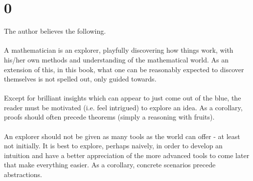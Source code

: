 \documentclass[english]{article}
\begin{document}
\section*{0}
The author believes the following.
\\\\
A mathematician is an explorer, playfully discovering how things work, with his/her own methods and understanding of the mathematical world. As an extension of this, in this book, what one can be reasonably expected to discover themselves is not spelled out, only guided towards. \\\\
Except for brilliant insights which can appear to just come out of the blue, the reader must be motivated (i.e. feel intrigued) to explore an idea. As a corollary, proofs should often precede theorems (simply a reasoning with fruits).\\\\
An explorer should not be given as many tools as the world can offer - at least not initially. It is best to explore, perhaps naively, in order to develop an intuition and have a better appreciation of the more advanced tools to come later that make everything easier. As a corollary, concrete scenarios precede abstractions.

\newpage
\end{document}
